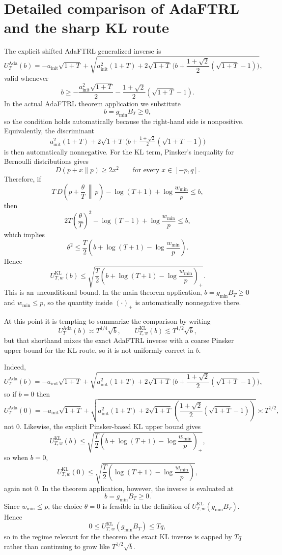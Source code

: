 \documentclass[11pt]{article}
\newcommand{\1}{\mathbf{1}}
\begin{document}
\section{Detailed comparison of AdaFTRL and the sharp KL route}
\label{app:comparison-details}

The explicit shifted AdaFTRL generalized inverse is
\[
U_T^{\mathrm{Ada}}(b)
=
-a_{\mathrm{init}}\sqrt{1+T}
+
\sqrt{
a_{\mathrm{init}}^2(1+T)
+
2\sqrt{1+T}\,\bigl(b+\frac{1+\sqrt{2}}{2}(\sqrt{1+T}-1)\bigr)
},
\]
valid whenever
\[
b\ge -\frac{a_{\mathrm{init}}^2\sqrt{1+T}}{2}-\frac{1+\sqrt{2}}{2}(\sqrt{1+T}-1).
\]
In the actual AdaFTRL theorem application we substitute
\[
b=g_{\min}B_T\ge 0,
\]
so the condition holds automatically because the right-hand side is nonpositive. Equivalently, the discriminant
\[
a_{\mathrm{init}}^2(1+T)+2\sqrt{1+T}\,\bigl(b+\tfrac{1+\sqrt{2}}{2}(\sqrt{1+T}-1)\bigr)
\]
is then automatically nonnegative.
For the KL term, Pinsker's inequality for Bernoulli distributions gives
\[
D(p+x\|p)\ge 2x^2
\qquad\text{for every }x\in[-p,q].
\]
Therefore, if
\[
T\,D\!\left(p+\frac{\theta}{T}\,\middle\|\,p\right)-\log(T+1)+\log\frac{w_{\min}}{p}\le b,
\]
then
\[
2T\left(\frac{\theta}{T}\right)^2-\log(T+1)+\log\frac{w_{\min}}{p}\le b,
\]
which implies
\[
\theta^2\le \frac{T}{2}\left(b+\log(T+1)-\log\frac{w_{\min}}{p}\right).
\]
Hence
\[
U_{T,w}^{\mathrm{KL}}(b)
\le
\sqrt{\frac{T}{2}\left(b+\log(T+1)-\log\frac{w_{\min}}{p}\right)_+}.
\]
This is an unconditional bound. In the main theorem application, $b=g_{\min}B_T\ge 0$ and $w_{\min}\le p$, so the quantity inside $(\cdot)_+$ is automatically nonnegative there.

At this point it is tempting to summarize the comparison by writing
\[
U_T^{\mathrm{Ada}}(b)\asymp T^{1/4}\sqrt{b},
\qquad
U_{T,w}^{\mathrm{KL}}(b)\lesssim T^{1/2}\sqrt{b},
\]
but that shorthand mixes the exact AdaFTRL inverse with a coarse Pinsker upper bound for the KL route, so it is not uniformly correct in \(b\).

Indeed,
\[
U_T^{\mathrm{Ada}}(b)
=
-a_{\mathrm{init}}\sqrt{1+T}
+
\sqrt{
a_{\mathrm{init}}^2(1+T)
+
2\sqrt{1+T}\,\bigl(b+\frac{1+\sqrt{2}}{2}(\sqrt{1+T}-1)\bigr)
},
\]
so if \(b=0\) then
\[
U_T^{\mathrm{Ada}}(0)
=
-a_{\mathrm{init}}\sqrt{1+T}
+
\sqrt{
a_{\mathrm{init}}^2(1+T)
+
2\sqrt{1+T}\,(\frac{1+\sqrt{2}}{2}(\sqrt{1+T}-1))
}
\asymp T^{1/2},
\]
not \(0\). Likewise, the explicit Pinsker-based KL upper bound gives
\[
U_{T,w}^{\mathrm{KL}}(b)
\le
\sqrt{\frac{T}{2}\left(b+\log(T+1)-\log\frac{w_{\min}}{p}\right)_+},
\]
so when \(b=0\),
\[
U_{T,w}^{\mathrm{KL}}(0)\le \sqrt{\frac{T}{2}\left(\log(T+1)-\log\frac{w_{\min}}{p}\right)},
\]
again not \(0\). In the theorem application, however, the inverse is evaluated at
\[
b=g_{\min}B_T\ge 0.
\]
Since \(w_{\min}\le p\), the choice \(\theta=0\) is feasible in the definition of \(U_{T,w}^{\mathrm{KL}}(g_{\min}B_T)\). Hence
\[
0\le U_{T,w}^{\mathrm{KL}}(g_{\min}B_T)\le Tq,
\]
so in the regime relevant for the theorem the exact KL inverse is capped by \(Tq\) rather than continuing to grow like \(T^{1/2}\sqrt b\).
\end{document}
